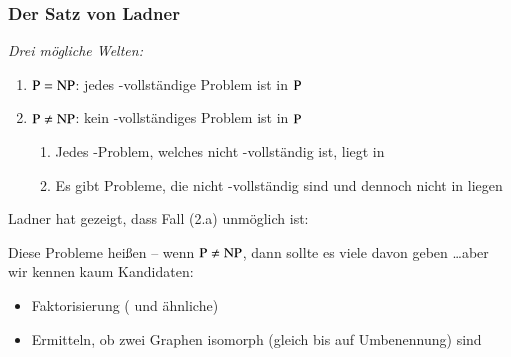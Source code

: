 \documentclass[aspectratio=1610,onlymath]{beamer}
\begin{document}
\begin{frame}\frametitle{Der Satz von Ladner}

\emph{Drei mögliche Welten:}
\begin{enumerate}[(1)]
\item ${\textsc{P}}={\textsc{NP}}$: jedes -vollständige Problem ist in ${\textsc{P}}$
\item ${\textsc{P}}\neq{\textsc{NP}}$: kein -vollständiges Problem ist in ${\textsc{P}}$
\begin{enumerate}[(2.a)]
\item Jedes -Problem, welches nicht -vollständig ist, liegt in 
\item Es gibt Probleme, die nicht -vollständig sind und dennoch nicht in  liegen
\end{enumerate}
\end{enumerate}\pause\bigskip

Ladner hat gezeigt, dass Fall (2.a) unmöglich ist:


Diese Probleme heißen  \pause{} -- wenn ${\textsc{P}}\neq{\textsc{NP}}$, dann sollte es viele davon geben \ldots aber wir kennen kaum Kandidaten:
\begin{itemize}
\item Faktorisierung ( und ähnliche)
\item Ermitteln, ob zwei Graphen isomorph (gleich bis auf Umbenennung) sind
\end{itemize}


\end{frame}
\end{document}
